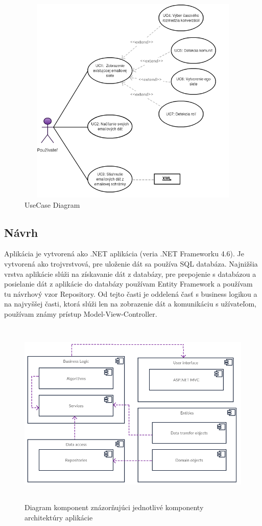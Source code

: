 \documentclass[slovak,master,public,dept460,male,cpdeclaration,oneside]{diploma}
\begin{document}
\begin{figure}[H]
\centering
\includegraphics[width=12cm, height=10cm]{figures/diagram_usecase}
\caption{UseCase Diagram}
\end{figure}


\subsection{Návrh}
Aplikácia je vytvorená ako .NET aplikácia (veria .NET Frameworku 4.6). Je vytvorená ako trojvrstvová, pre uloženie dát sa používa SQL databáza. Najnižšia vrstva aplikácie slúži na získavanie dát z databázy, pre prepojenie s databázou a posielanie dát z aplikácie do databázy používam Entity Framework a používam tu návrhový vzor Repository. Od tejto časti je oddelená časť s business logikou a na najvyššej časti, ktorá slúži len na zobrazenie dát a komunikáciu s užívateľom, používam známy prístup Model-View-Controller.


\begin{figure}[H]
\centering
\includegraphics[width=15cm, height=9cm]{figures/diagram_komponent}
\caption{Diagram komponent znázorňujúci jednotlivé komponenty architektúry aplikácie}
\end{figure}
\end{document}
